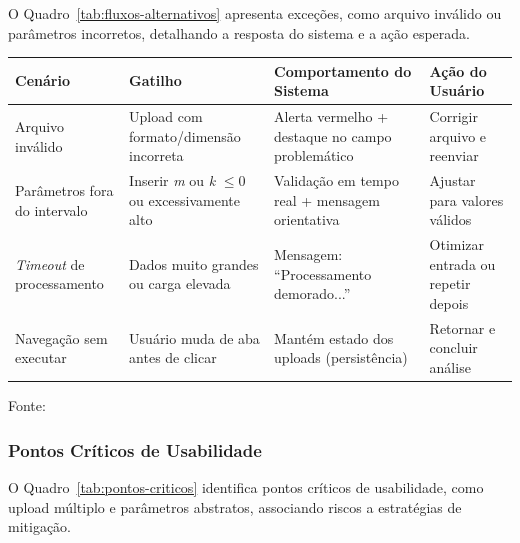 O Quadro~\ref{tab:fluxos-alternativos} apresenta exceções, como arquivo inválido ou parâmetros incorretos, detalhando a resposta do sistema e a ação esperada.

\begin{quadro}[ht]
\begin{center}
\footnotesize
\captionsetup{justification=centering, labelsep=endash, width=0.75\linewidth}
\caption{Fluxos alternativos e tratamento de exceções.}
\label{tab:fluxos-alternativos}
\begin{threeparttable}
\begin{tabularx}{\textwidth}{|l|X|X|l|} \hline
\textbf{Cenário} & \textbf{Gatilho} & \textbf{Comportamento do Sistema} & \textbf{Ação do Usuário} \\ \hline
Arquivo inválido & Upload com formato/dimensão incorreta & Alerta vermelho + destaque no campo problemático & Corrigir arquivo e reenviar \\ \hline
Parâmetros fora do intervalo & Inserir \textit{m} ou \textit{k} $\leq 0$ ou excessivamente alto & Validação em tempo real + mensagem orientativa & Ajustar para valores válidos \\ \hline
\textit{Timeout} de processamento & Dados muito grandes ou carga elevada & Mensagem: ``Processamento demorado...'' & Otimizar entrada ou repetir depois \\ \hline
Navegação sem executar & Usuário muda de aba antes de clicar & Mantém estado dos uploads (persistência) & Retornar e concluir análise \\ \hline
\end{tabularx}
\begin{tablenotes}[flushleft]
\footnotesize
\item Fonte:~\oautor
\end{tablenotes}
\end{threeparttable}
\end{center}
\end{quadro}


\newpage
\subsubsection{Pontos Críticos de Usabilidade}
\label{ssubsec:pontos-criticos}

O Quadro~\ref{tab:pontos-criticos} identifica pontos críticos de usabilidade, como upload múltiplo e parâmetros abstratos, associando riscos a estratégias de mitigação.

